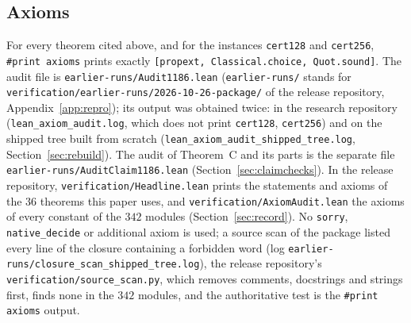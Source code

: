 \documentclass[11pt]{amsart}
\theoremstyle{remark}
\newcommand{\lean}[1]{\texttt{#1}}
\begin{document}
\subsection{Axioms}
For every theorem cited above, and for the instances \lean{cert128} and \lean{cert256}, \lean{\#print axioms} prints exactly \lean{[propext, Classical.choice, Quot.sound]}. The audit file is \texttt{earlier-runs/Audit1186.lean} (\texttt{earlier-runs/} stands for \texttt{verification/earlier-runs/2026-10-26-package/} of the release repository, Appendix~\ref{app:repro}); its output was obtained twice: in the research repository (\texttt{lean\_axiom\_audit.log}, which does not print \lean{cert128}, \lean{cert256}) and on the shipped tree built from scratch (\texttt{lean\_axiom\_audit\_shipped\_tree.log}, Section~\ref{sec:rebuild}). The audit of Theorem~C and its parts is the separate file \texttt{earlier-runs/AuditClaim1186.lean} (Section~\ref{sec:claimchecks}). In the release repository, \texttt{verification/Headline.lean} prints the statements and axioms of the $36$ theorems this paper uses, and \texttt{verification/AxiomAudit.lean} the axioms of every constant of the $342$ modules (Section~\ref{sec:record}). No \texttt{sorry},
\texttt{native\_decide} or additional axiom is used; a source scan of the package listed every line of the closure containing a forbidden word (log \texttt{earlier-runs/closure\_scan\_shipped\_tree.log}), the release repository's \texttt{verification/source\_scan.py}, which removes comments, docstrings and strings first, finds none in the $342$ modules, and the authoritative test is the \lean{\#print axioms} output.
\end{document}
